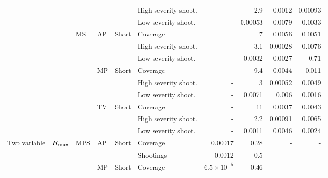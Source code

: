 \documentclass[article]{standalone}
\begin{document}
\begin{tabular}{llllllrrrr}
             &                   &    &    &       & High severity shoot. &                    - &       2.9 &               0.0012 &               0.00093 \\
             &                   &    &    &       & Low severity shoot. &                    - &   0.00053 &               0.0079 &                0.0033 \\
             &                   & MS & AP & Short & Coverage &                    - &         7 &               0.0056 &                0.0051 \\
             &                   &    &    &       & High severity shoot. &                    - &       3.1 &              0.00028 &                0.0076 \\
             &                   &    &    &       & Low severity shoot. &                    - &    0.0032 &               0.0027 &                  0.71 \\
             &                   &    & MP & Short & Coverage &                    - &       9.4 &               0.0044 &                 0.011 \\
             &                   &    &    &       & High severity shoot. &                    - &         3 &              0.00052 &                0.0049 \\
             &                   &    &    &       & Low severity shoot. &                    - &    0.0071 &                0.006 &                0.0016 \\
             &                   &    & TV & Short & Coverage &                    - &        11 &               0.0037 &                0.0043 \\
             &                   &    &    &       & High severity shoot. &                    - &       2.2 &              0.00091 &                0.0065 \\
             &                   &    &    &       & Low severity shoot. &                    - &    0.0011 &               0.0046 &                0.0024 \\
Two variable & $H_{\rm{max}}$ & MPS & AP & Short & Coverage &              0.00017 &      0.28 &                    - &                     - \\
             &                   &    &    &       & Shootings &               0.0012 &       0.5 &                    - &                     - \\
             &                   &    & MP & Short & Coverage & $6.5 \times 10^{-5}$ &      0.46 &                    - &                     - \\

\end{tabular}
\end{document}
